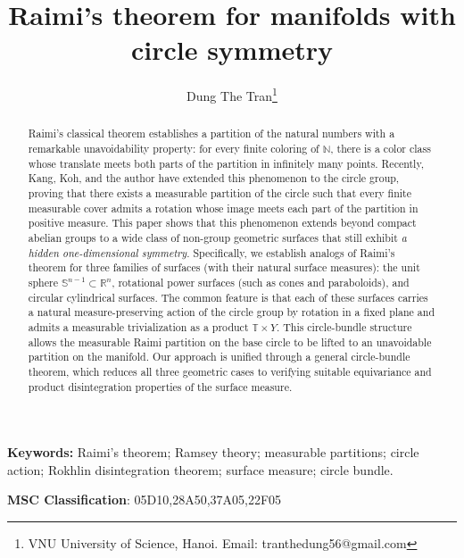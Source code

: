 \documentclass[11pt]{article}
\numberwithin{equation}{section}
\theoremstyle{remark}
\begin{document}
\title{Raimi's theorem for manifolds with circle symmetry}
\author{Dung The Tran\thanks{VNU University of Science, Hanoi. Email: tranthedung56@gmail.com}}


\date{}
\maketitle


\begin{abstract}
Raimi's classical theorem establishes a partition of the natural numbers with a remarkable unavoidability property: for every finite coloring of $\mathbb{N}$, there is a color class whose translate meets both parts of the partition in infinitely many points. Recently, Kang, Koh, and the author have extended this phenomenon to the circle group, proving that there exists a measurable partition of the circle such that every finite measurable cover admits a rotation whose image meets each part of the partition in positive measure. This paper shows that this phenomenon extends beyond compact abelian groups to a wide class of non-group geometric surfaces that still exhibit \textit{a hidden one-dimensional symmetry}. Specifically, we establish analogs of Raimi's theorem for three families of surfaces (with their natural surface measures): the unit sphere $\mathbb{S}^{n-1} \subset \mathbb{R}^n$, rotational power surfaces (such as cones and paraboloids), and circular cylindrical surfaces. The common feature is that each of these surfaces carries a natural measure-preserving action of the circle group by rotation in a fixed plane and admits a measurable trivialization as a product $\mathbb{T} \times Y$. This circle-bundle structure allows the measurable Raimi partition on the base circle to be lifted to an unavoidable partition on the manifold. Our approach is unified through a general circle-bundle theorem, which reduces all three geometric cases to verifying suitable equivariance and product disintegration properties of the surface measure.
\end{abstract}


\textbf{Keywords:} Raimi's theorem; Ramsey theory; measurable partitions; circle action; Rokhlin disintegration theorem; surface measure; circle bundle.

\textbf{MSC Classification}: 05D10,28A50,37A05,22F05




\end{document}

